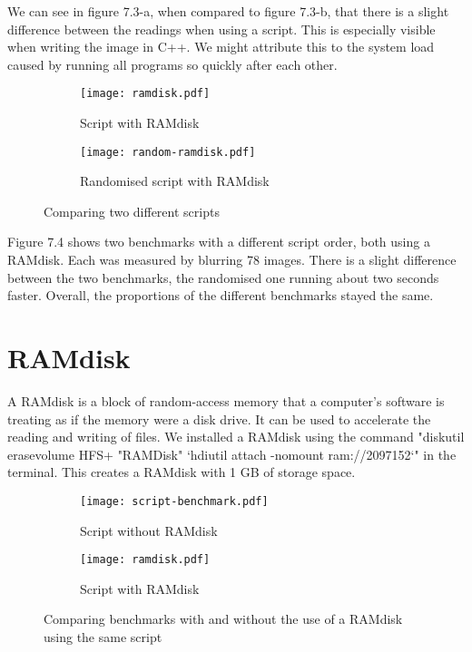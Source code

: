 We can see in figure 7.3-a, when compared to figure 7.3-b, that there is a slight difference between the readings when using a script. This is especially visible when writing the image in C++. We might attribute this to the system load caused by running all programs so quickly after each other.

\begin{figure}[H]
	\centering
	\begin{subfigure}{.5\textwidth}
	  \centering
	  \texttt{[image: ramdisk.pdf]}
	  \caption{Script with RAMdisk}
	  \label{fig:ramdisk}
	\end{subfigure}%
	\begin{subfigure}{.5\textwidth}
	  \centering
	  \texttt{[image: random-ramdisk.pdf]}
	  \caption{Randomised script with RAMdisk}
	  \label{fig:random-ramdisk}
	\end{subfigure}
	\caption{Comparing two different scripts}
	\label{fig:two-scripts}
\end{figure}

Figure 7.4 shows two benchmarks with a different script order, both using a RAMdisk. Each was measured by blurring 78 images. There is a slight difference between the two benchmarks, the randomised one running about two seconds faster. Overall, the proportions of the different benchmarks stayed the same.

\section{RAMdisk}
A RAMdisk is a block of random-access memory that a computer's software is treating as if the memory were a disk drive. It can be used to accelerate the reading and writing of files. We installed a RAMdisk using the command "diskutil erasevolume HFS+ "RAMDisk" `hdiutil attach -nomount ram://2097152`" in the terminal. This creates a RAMdisk with 1 GB of storage space.

\begin{figure}[H]
	\centering
	\begin{subfigure}{.5\textwidth}
	  \centering
	  \texttt{[image: script-benchmark.pdf]}
	  \caption{Script without RAMdisk}
	  \label{fig:script2}
	\end{subfigure}%
	\begin{subfigure}{.5\textwidth}
	  \centering
	  \texttt{[image: ramdisk.pdf]}
	  \caption{Script with RAMdisk}
	  \label{fig:ramdisk2}
	\end{subfigure}
	\caption{Comparing benchmarks with and without the use of a RAMdisk using the same script}
	\label{fig:ramdisk-vs-noramdisk}
\end{figure}

